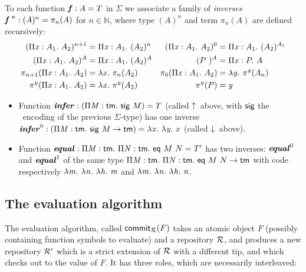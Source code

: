 \documentclass{llncs}
\begin{document}
\begin{definition}
  To each function $\fct f : A = T$ in $\Sigma$ we associate a family
  of \emph{inverses} $\fcti f {\;n} : (A)^n = \pi_n(A)$ for $n\in\mathbb
  N$, where type $(A)^n$ and term $\pi_n(A)$ are defined recursively:
  \begin{align*}
    (\prd x {A_1} {A_2})^{n+1} &= \prd x {A_1} (A_2)^n &
    (\prd x {A_1} {A_2})^0 &= \prd x {A_1} (A_2)^{A_1} \\
    (\prd x {A_1} {A_2})^A &= \prd x {A_1} (A_2)^A &
    (\app P)^A &= \prd x P A \\
    \pi_{n+1}(\prd x {A_1}{A_2}) &= \lam x \pi_n(A_2) &
    \pi_0(\prd x {A_1} {A_2}) &= \lam {y} \pi^y(A_n) \\
    \pi^y(\prd x {A_1}{A_2}) &= \lam x \pi^y (A_2) &
    \pi^y(P) &= \var y
  \end{align*}
\end{definition}

\begin{example}
  \begin{itemize}
  \item
    Function $\fct{infer} : (\prd M {\cst{tm}} \app{\cst{sig}} M)
    = T$ (called $\finfer{}$ above, with $\cst{sig}$ the \LF\ encoding
    of the previous $\Sigma$-type) has one inverse $\fcti{infer}{0} :
    (\prd M {\cst{tm}} {\app{\cst{sig}} M} \to \cst{tm}) = \lam x \lam
    y \var x$ (called $\fget{}$ above).
  \item
    Function $\fct{equal} : \prd M {\cst{tm}} \prd N {\cst{tm}}
    \app{\cst{eq}}\app M N = T'$ has two inverses: $\fcti{equal}{0}$
    and $\fcti{equal}{1}$ of the same type $\prd M {\cst{tm}} \prd N
    {\cst{tm}} \app{\cst{eq}}\app M N \to \cst{tm}$ with code
    respectively $\lam m \lam n \lam h \var m$ and $\lam m \lam n \lam
    h \var n$.
  \end{itemize}
\end{example}

\subsection{The evaluation algorithm}
\label{sec:eval}

The evaluation algorithm, called $\function{commit$_\mr$}{F}$ takes an
atomic object $F$ (possibly containing function symbols to evaluate)
and a repository $\mr$, and produces a new repository $\mr'$ which is
a strict extension of $\mr$ with a different tip, and which checks out
to the value of $F$. It has three roles, which are necessarily
interleaved:
\end{document}
